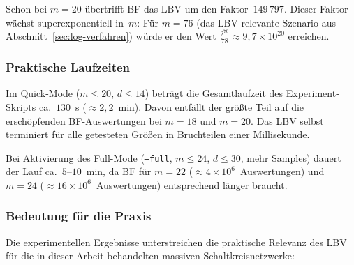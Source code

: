 ﻿\documentclass[a4paper,12pt]{article}
\theoremstyle{definition}
\begin{document}
Schon bei $m = 20$ übertrifft BF das LBV um den Faktor~$149\,797$.  Dieser Faktor
wächst superexponentiell in~$m$: Für $m = 76$ (das LBV-relevante Szenario aus
Abschnitt~\ref{sec:log-verfahren}) würde er den Wert
$\frac{2^{76}}{78} \approx 9{,}7 \times 10^{20}$ erreichen.

\subsubsection{Praktische Laufzeiten}

Im Quick-Mode ($m \leq 20$, $d \leq 14$) beträgt die Gesamtlaufzeit des Experiment-Skripts
ca.\ $130$~s ($\approx 2{,}2$~min).  Davon entfällt der größte Teil auf die erschöpfenden
BF-Auswertungen bei $m = 18$ und $m = 20$.  Das LBV selbst terminiert für alle getesteten
Größen in Bruchteilen einer Millisekunde.

Bei Aktivierung des Full-Mode (\texttt{--full}, $m \leq 24$, $d \leq 30$, mehr Samples)
dauert der Lauf ca.\ $5$--$10$~min, da BF für $m = 22$ ($\approx 4 \times 10^6$~Aus\-wertungen)
und $m = 24$ ($\approx 16 \times 10^6$~Auswertungen) entsprechend länger braucht.

\subsubsection{Bedeutung für die Praxis}

Die experimentellen Ergebnisse unterstreichen die praktische Relevanz des LBV für
die in dieser Arbeit behandelten massiven Schaltkreisnetzwerke:
\end{document}

